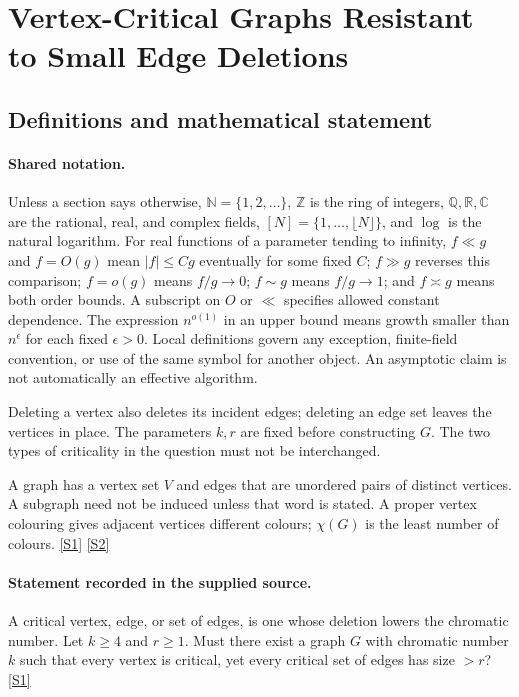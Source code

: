 \documentclass[11pt,a4paper]{article}
\newcommand{\N}{\mathbb{N}}
\newcommand{\Z}{\mathbb{Z}}
\newcommand{\Q}{\mathbb{Q}}
\newcommand{\R}{\mathbb{R}}
\newcommand{\C}{\mathbb{C}}
\newcommand{\sref}[2]{\hyperlink{source:#1:#2}{[S#2]}}
\begin{document}
\section{Vertex-Critical Graphs Resistant to Small Edge Deletions}\label{statement}


\subsection{Definitions and mathematical statement}

\paragraph{Shared notation.}Unless a section says otherwise, $\N=\{1,2,\ldots\}$,
$\Z$ is the ring of integers, $\Q,\R,\C$ are the rational, real, and complex
fields, $[N]=\{1,\ldots,\lfloor N\rfloor\}$, and $\log$ is the natural
logarithm. For real functions of a parameter tending to infinity,
$f\ll g$ and $f=O(g)$ mean $|f|\leq Cg$ eventually for some fixed $C$;
$f\gg g$ reverses this comparison; $f=o(g)$ means $f/g\to0$;
$f\sim g$ means $f/g\to1$; and $f\asymp g$ means both order bounds.
A subscript on $O$ or $\ll$ specifies allowed constant dependence.
The expression $n^{o(1)}$ in an upper bound means growth smaller than
$n^\epsilon$ for each fixed $\epsilon>0$. Local definitions govern any
exception, finite-field convention, or use of the same symbol for another
object. An asymptotic claim is not automatically an effective algorithm.



Deleting a vertex also deletes its incident edges; deleting an edge set leaves the vertices in place. The parameters $k,r$ are fixed before constructing $G$. The two types of criticality in the question must not be interchanged.

A graph has a vertex set $V$ and edges that are unordered pairs of distinct vertices. A subgraph need not be induced unless that word is stated. A proper vertex colouring gives adjacent vertices different colours; $\chi(G)$ is the least number of colours. \sref{statement}{1} \sref{statement}{2}

\paragraph{Statement recorded in the supplied source.}
A critical vertex, edge, or set of edges, is one whose deletion lowers the chromatic number.
Let $k\geq 4$ and $r\geq 1$. Must there exist a graph $G$ with chromatic number $k$ such that every vertex is critical, yet every critical set of edges has size $>r$? \sref{statement}{1}
\end{document}
